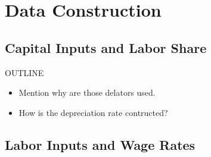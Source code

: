 \documentclass[12pt]{article}
\begin{document}

\pagebreak{}




\pagebreak{}

\appendix

\section{Data Construction}\label{sec:data-construction}


\subsection{Capital Inputs and Labor Share}\label{subsec:capital-inputs-labor-share}
OUTLINE
\begin{itemize}
	\item Mention why are those delators used.
	\item How is the depreciation rate contructed?
\end{itemize}


\subsection{Labor Inputs and Wage Rates}\label{subsec:labor-inputs-wage-rates}



\end{document}
